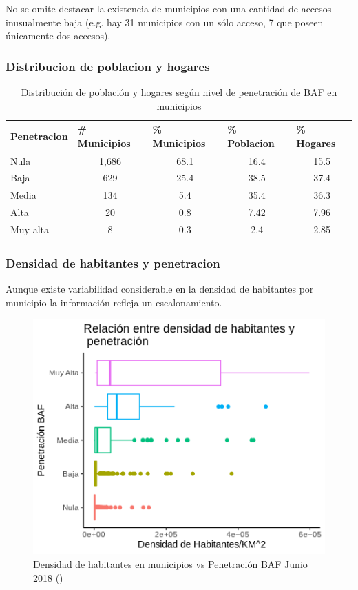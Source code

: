 \documentclass[9pt,twocolumn,twoside]{ilcss}
\begin{document}
No se omite destacar la existencia de municipios con una cantidad de accesos inusualmente baja (e.g. hay 31 municipios con un sólo acceso, 7 que poseen únicamente dos accesos).

\subsubsection{Distribucion de poblacion y hogares}

\begin{table}[tbhp]
\centering
\caption{Distribución de población y hogares según nivel de penetración de BAF en municipios}
\label{tab:dist_pob_hogs}
\begin{tabular}{@{}lcccc@{}}
	\toprule
	Penetracion & \multicolumn{1}{l}{\# Municipios} & \multicolumn{1}{l}{\% Municipios} & \multicolumn{1}{l}{\% Poblacion} & \multicolumn{1}{l}{\% Hogares} \\ \midrule
	Nula & 1,686 & 68.1 & 16.4 & 15.5 \\
	Baja & 629 & 25.4 & 38.5 & 37.4 \\
	Media & 134 & 5.4 & 35.4 & 36.3 \\
	Alta & 20 & 0.8 & 7.42 & 7.96 \\
	Muy alta & 8 & 0.3 & 2.4 & 2.85 \\ \bottomrule
\end{tabular}
\end{table}

\subsubsection{Densidad de habitantes y penetracion}

Aunque existe variabilidad considerable en la densidad de habitantes por municipio la información refleja un escalonamiento.

\begin{figure}[tbhp]
	\centering
	\includegraphics[width=1.0\linewidth]{images/pen_denhabs.png}
	\caption{Densidad de habitantes en municipios vs Penetración BAF Junio 2018 (\cite{IFT2019BIT})}
	\label{fig:pen_denhabs}
\end{figure}
\end{document}

